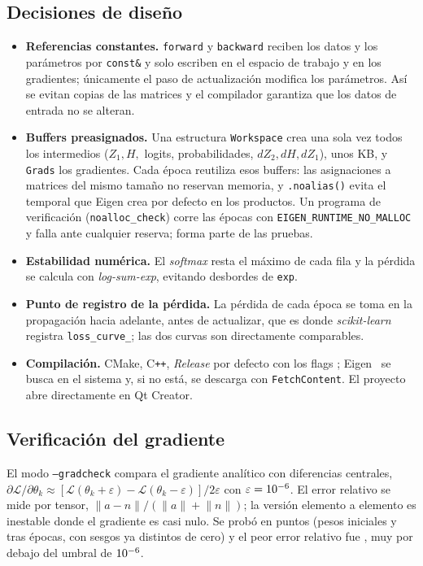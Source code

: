 \documentclass[11pt,a4paper]{article}
\newcommand{\cpp}{C\texttt{++}\xspace}
\newcommand{\sk}{\textit{scikit-learn}\xspace}
\begin{document}
\subsection{Decisiones de dise\~no}
\begin{itemize}
\item \textbf{Referencias constantes.} \texttt{forward} y \texttt{backward} reciben los datos y los par\'ametros por \texttt{const\&} y solo escriben en el espacio de trabajo y en los gradientes; \'unicamente el paso de actualizaci\'on modifica los par\'ametros. As\'i se evitan copias de las matrices y el compilador garantiza que los datos de entrada no se alteran.
\item \textbf{Buffers preasignados.} Una estructura \texttt{Workspace} crea una sola vez todos los intermedios (\(Z_1,H,\) logits, probabilidades, \(dZ_2,dH,dZ_1\)), unos \workspaceKB{} KB, y \texttt{Grads} los gradientes. Cada \'epoca reutiliza esos buffers: las asignaciones a matrices del mismo tama\~no no reservan memoria, y \texttt{.noalias()} evita el temporal que Eigen crea por defecto en los productos. Un programa de verificaci\'on (\texttt{noalloc\_check}) corre las \nEpochs{} \'epocas con \texttt{EIGEN\_RUNTIME\_NO\_MALLOC} y falla ante cualquier reserva; forma parte de las pruebas.
\item \textbf{Estabilidad num\'erica.} El \textit{softmax} resta el m\'aximo de cada fila y la p\'erdida se calcula con \textit{log-sum-exp}, evitando desbordes de \texttt{exp}.
\item \textbf{Punto de registro de la p\'erdida.} La p\'erdida de cada \'epoca se toma en la propagaci\'on hacia adelante, antes de actualizar, que es donde \sk registra \texttt{loss\_curve\_}; las dos curvas son directamente comparables.
\item \textbf{Compilaci\'on.} CMake, \cpp\cppStd, \textit{Release} por defecto con los flags \envFlags; Eigen~\envEigen{} se busca en el sistema y, si no est\'a, se descarga con \texttt{FetchContent}. El proyecto abre directamente en Qt Creator.
\end{itemize}

\subsection{Verificaci\'on del gradiente}
El modo \texttt{--gradcheck} compara el gradiente anal\'itico con diferencias centrales, $\partial\mathcal{L}/\partial\theta_k\approx[\mathcal{L}(\theta_k+\varepsilon)-\mathcal{L}(\theta_k-\varepsilon)]/2\varepsilon$ con $\varepsilon=10^{-6}$. El error relativo se mide por tensor, $\lVert a-n\rVert/(\lVert a\rVert+\lVert n\rVert)$; la versi\'on elemento a elemento es inestable donde el gradiente es casi nulo. Se prob\'o en \gradcheckPoints{} puntos (pesos iniciales y tras \checkEpochs{} \'epocas, con sesgos ya distintos de cero) y el peor error relativo fue \gradcheckMaxRel{}, muy por debajo del umbral de $10^{-6}$.
\end{document}
